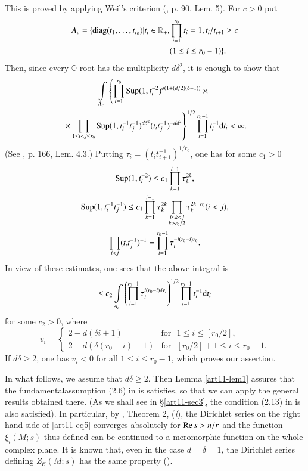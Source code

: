 This is proved by applying Weil's criterion (\cite{art11-keyW}, p. 90, Lem. 5). For $c>0$ put
\begin{align*}
A_{c}=\{\operatorname{diag}(t_{1},\ldots,t_{r_{0}})|t_{i}\in \mathbb{R}_{+}, &\prod\limits^{r_{0}}_{i=1}t_{i}=1, t_{i}/t_{i+1}\geq c\\
&(1\leq i\leq r_{0}-1)\}.
\end{align*}
Then, since every $\mathbb{O}$-root has the multiplicity $d\delta^{2}$, it is enough to show that
\begin{multline*}
\int\limits_{A_{c}}\left\{\prod\limits^{r_{0}}_{i=1}\operatorname{Sup} (1,t^{-2}_{i})^{\delta(1+(d/2)(\delta-1))}\times{}\right.\\
\left.{}\times \prod\limits_{1\leq i<j\leq r_{0}}\operatorname{Sup} (1,t^{-1}_{i}t^{-1}_{j})^{d\delta^{2}}(t_{i}t_{j}^{-1})^{-d\delta^{2}}\right\}^{1/2}\prod\limits^{r_{0}-1}_{i=1}t^{-1}_{i}\mathrm{d} t_{i}<\infty.
\end{multline*}
(See \cite{art11-keySS}, p. 166, Lem. 4.3.) Putting $\tau_{i}=(t_{i}t_{i+1}^{-1})^{1/r_{0}}$, one has for some $c_{1}>0$
\begin{gather*}
\operatorname{Sup} (1,t^{-2}_{i})\leq c_{1}\prod\limits^{i-1}_{k=1}\tau^{2k}_{k},\\
\operatorname{Sup} (1,t^{-1}_{t}t^{-1}_{j})\leq c_{1}\prod\limits^{i-1}_{k=1}\tau^{2k}_{k}\prod\limits_{\substack{i\leq k<j\\ k\geq r_{0}/2}}\tau^{2k-r_{0}}_{k}(i<j),\\
\prod\limits_{i<j}(t_{i}t^{-1}_{j})^{-1}=\prod\limits^{r_{0}-1}_{i=1}\tau^{-i(r_{0}-i)r_{0}}_{i}.
\end{gather*}
In view of these estimates, one sees that the above integral is
$$
\leq c_{2}\int\limits_{A_{c}}\left(\prod\limits^{r_{0}-1}_{i=1}\tau^{i(r_{0}-i)\delta v_{i}}_{i}\right)^{1/2}\prod\limits^{r_{0}-1}_{i=1}t^{-1}_{i}\mathrm{d} t_{i}
$$
for some $c_{2}>0$, where
$$
v_{i}=
\begin{cases}
2-d(\delta i+1) & \text{for~ } 1\leq i\leq [r_{0}/2],\\
2-d(\delta(r_{0}-i)+1) & \text{for~ } [r_{0}/2]+1\leq i\leq r_{0}-1.
\end{cases}
$$
If $d\delta\geq 2$, one has $v_{i}<0$ for all $1\leq i\leq r_{0}-1$, which proves our assertion.

In what follows, we assume that $d\delta \geq 2$. Then Lemma \ref{art11-lem1} assures that the fundamental\pageoriginale assumption (2.6) in \cite{art11-keySS} is satisfies, so that we can apply the general results obtained there. (As we shall see in \S\ref{art11-sec3}, the condition (2.13) in \cite{art11-keySS} is also satisfied). In particular, by \cite{art11-keySS}, Theorem 2, ({\em i}), the Dirichlet series on the right hand side of \eqref{art11-eq5} converges absolutely for $\operatorname{Re} s>n/r$ and the function $\xi_{i}(M;s)$ thus defined can be continued to a meromorphic function on the whole complex plane. It is known that, even in the case $d=\delta=1$, the Dirichlet series defining $Z_{\mathscr{C}}(M;s)$ has the same property (\cite{art11-keySh}).

